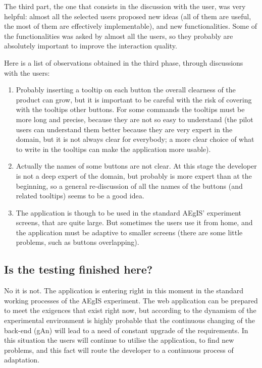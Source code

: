 The third part, the one that consists in the discussion with the user, was very helpful: almost all the selected users proposed new ideas (all of them are useful, the most of them are effectively implementable), and new functionalities. Some of the functionalities was asked by almost all the users, so they probably are absolutely important to improve the interaction quality. 

Here is a list of observations obtained in the third phase, through discussions with the users:

\begin{enumerate}

\item 
Probably inserting a tooltip on each button the overall clearness of the product can grow, but it is important to be careful with the risk of covering with the tooltips other buttons. For some commands the tooltips must be more long and precise, because they are not so easy to understand (the pilot users can understand them better because they are very expert in the domain, but it is not always clear for everybody; a more clear choice of what to write in the tooltips can make the application more usable).  

\item
Actually the names of some buttons are not clear. At this stage the developer is not a deep expert of the domain, but probably is more expert than at the beginning, so a general re-discussion of all the names of the buttons (and related tooltips) seems to be a good idea.

\item 
The application is though to be used in the standard AEgIS' experiment screens, that are quite large. But sometimes the users use it from home, and the application must be adaptive to smaller screens (there are some little problems, such as buttons overlapping).

\end{enumerate}

\subsection{Is the testing finished here?}

No it is not. The application is entering right in this moment in the standard working processes of the AEgIS experiment. The web application can be prepared to meet the exigences that exist right now, but according to the dynamism of the experimental environment is highly probable that the continuous changing of the back-end (gAn) will lead to a need of constant upgrade of the requirements. In this situation the users will continue to utilise the application, to find new problems, and this fact will route the developer to a continuous process of adaptation.   